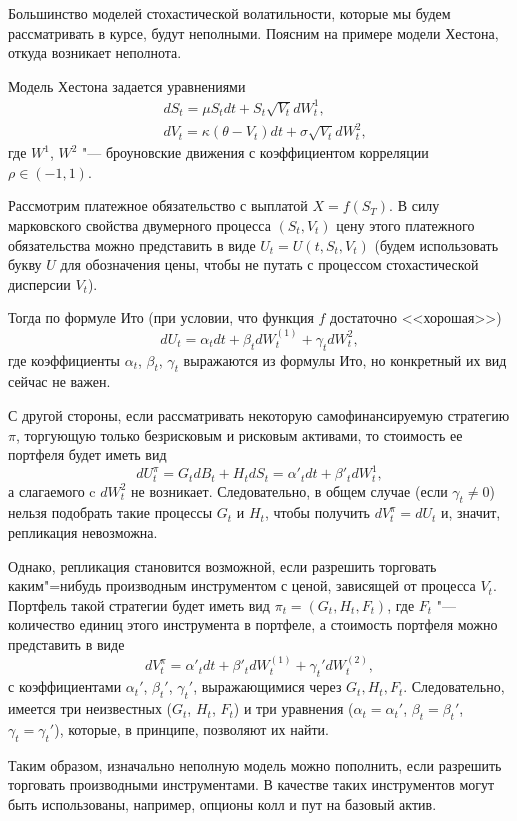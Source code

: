 Большинство моделей стохастической волатильности, которые мы будем рассматривать в курсе, будут неполными.
Поясним на примере модели Хестона, откуда возникает неполнота.

Модель Хестона задается уравнениями
\begin{align*}
&dS_t = \mu S_t dt + S_t\sqrt{V_t} d W_t^{1},\\
&d V_t = \kappa(\theta - V_t)dt + \sigma \sqrt{V_t} d W_t^{2},
\end{align*}
где $W^{1}$, $W^{2}$ "--- броуновские движения с коэффициентом корреляции $\rho \in (-1,1)$.

Рассмотрим платежное обязательство с выплатой $X=f(S_T)$.
В силу марковского свойства двумерного процесса $(S_t,V_t)$ цену этого платежного обязательства можно представить в виде $U_t = U(t,S_t,V_t)$ (будем использовать букву $U$ для обозначения цены, чтобы не путать с процессом стохастической дисперсии $V_t$).

Тогда по формуле Ито (при условии, что функция $f$ достаточно <<хорошая>>)
\[
d U_t = \alpha_t dt + \beta_t d W_t^{(1)} + \gamma_t d W_t^{2},
\]
где коэффициенты $\alpha_t$, $\beta_t$, $\gamma_t$ выражаются из формулы Ито, но конкретный их вид сейчас не важен. 

С другой стороны, если рассматривать некоторую самофинансируемую стратегию $\pi$, торгующую только безрисковым и рисковым активами, то стоимость ее портфеля будет иметь вид
\[
d U_t^\pi = G_t dB_t + H_tdS_t = \alpha'_t dt + \beta'_t dW_t^{1},
\]
а слагаемого c $d W_t^{2}$ не возникает.
Следовательно, в общем случае (если $\gamma_t\neq 0$) нельзя подобрать такие процессы $G_t$ и $H_t$, чтобы получить $d V_t^\pi = d U_t$ и, значит, репликация невозможна.

Однако, репликация становится возможной, если разрешить торговать каким"=нибудь производным инструментом с ценой, зависящей от процесса $V_t$.
Портфель такой стратегии будет иметь вид $\pi_t=(G_t,H_t,F_t)$, где $F_t$ "--- количество единиц этого инструмента в портфеле, а стоимость портфеля можно представить в виде
\[
d V_t^\pi = \alpha'_t dt + \beta'_t dW_t^{(1)} + \gamma_t' dW_t^{(2)},
\]
с коэффициентами $\alpha_t'$, $\beta_t'$, $\gamma_t'$, выражающимися через $G_t,H_t,F_t$.
Следовательно, имеется три неизвестных ($G_t$, $H_t$, $F_t$) и три уравнения ($\alpha_t=\alpha_t'$, $\beta_t=\beta_t'$, $\gamma_t=\gamma_t'$), которые, в принципе, позволяют их найти.

Таким образом, изначально неполную модель можно пополнить, если разрешить торговать производными инструментами.
В качестве таких инструментов могут быть использованы, например, опционы колл и пут на базовый актив.


